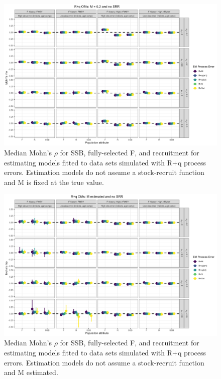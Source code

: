 \documentclass[
  12pt,
]{article}
\begin{document}
\begin{landscape}
\begin{figure}
\caption{Median Mohn's $\rho$ for SSB, fully-selected F, and recruitment for estimating models fitted to data sets simulated with R+q process errors.  Estimation models do not assume a stock-recruit function and M is fixed at the true value.}\label{q_om_em_R_MF_mohns_rho}
\begin{center}
\includegraphics[width = \textwidth]{q_om_mohns_rho_R_MF.png}
\end{center}
\end{figure}
\end{landscape}

\begin{landscape}
\begin{figure}
\caption{Median Mohn's $\rho$ for SSB, fully-selected F, and recruitment for estimating models fitted to data sets simulated with R+q process errors.  Estimation models do not assume a stock-recruit function and M estimated.}\label{q_om_em_R_ME_mohns_rho}
\begin{center}
\includegraphics[width = \textwidth]{q_om_mohns_rho_R_ME.png}
\end{center}
\end{figure}
\end{landscape}
\end{document}
